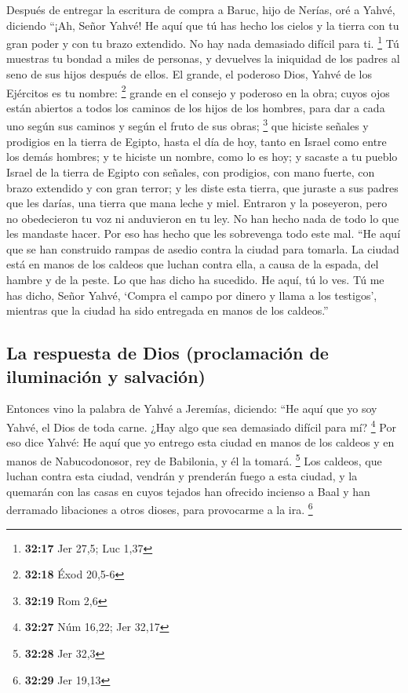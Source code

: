 \begin{paracol}{2}
 Después de entregar la escritura de compra a Baruc, hijo
de Nerías, oré a Yahvé, diciendo  ``¡Ah, Señor Yahvé! He
aquí que tú has hecho los cielos y la tierra con tu gran poder y con tu
brazo extendido. No hay nada demasiado difícil para ti. \footnote{\textbf{32:17}
  Jer 27,5; Luc 1,37}  Tú muestras tu bondad a miles de
personas, y devuelves la iniquidad de los padres al seno de sus hijos
después de ellos. El grande, el poderoso Dios, Yahvé de los Ejércitos es
tu nombre: \footnote{\textbf{32:18} Éxod 20,5-6}  grande
en el consejo y poderoso en la obra; cuyos ojos están abiertos a todos
los caminos de los hijos de los hombres, para dar a cada uno según sus
caminos y según el fruto de sus obras; \footnote{\textbf{32:19} Rom 2,6}
 que hiciste señales y prodigios en la tierra de Egipto,
hasta el día de hoy, tanto en Israel como entre los demás hombres; y te
hiciste un nombre, como lo es hoy;  y sacaste a tu pueblo
Israel de la tierra de Egipto con señales, con prodigios, con mano
fuerte, con brazo extendido y con gran terror;  y les
diste esta tierra, que juraste a sus padres que les darías, una tierra
que mana leche y miel.  Entraron y la poseyeron, pero no
obedecieron tu voz ni anduvieron en tu ley. No han hecho nada de todo lo
que les mandaste hacer. Por eso has hecho que les sobrevenga todo este
mal.  ``He aquí que se han construido rampas de asedio
contra la ciudad para tomarla. La ciudad está en manos de los caldeos
que luchan contra ella, a causa de la espada, del hambre y de la peste.
Lo que has dicho ha sucedido. He aquí, tú lo ves.  Tú me
has dicho, Señor Yahvé, `Compra el campo por dinero y llama a los
testigos', mientras que la ciudad ha sido entregada en manos de los
caldeos.''

\hypertarget{la-respuesta-de-dios-proclamaciuxf3n-de-iluminaciuxf3n-y-salvaciuxf3n}{%
\subsection{La respuesta de Dios (proclamación de iluminación y
salvación)}\label{la-respuesta-de-dios-proclamaciuxf3n-de-iluminaciuxf3n-y-salvaciuxf3n}}

 Entonces vino la palabra de Yahvé a Jeremías, diciendo:
 ``He aquí que yo soy Yahvé, el Dios de toda carne. ¿Hay
algo que sea demasiado difícil para mí? \footnote{\textbf{32:27} Núm
  16,22; Jer 32,17}  Por eso dice Yahvé: He aquí que yo
entrego esta ciudad en manos de los caldeos y en manos de Nabucodonosor,
rey de Babilonia, y él la tomará. \footnote{\textbf{32:28} Jer 32,3}
 Los caldeos, que luchan contra esta ciudad, vendrán y
prenderán fuego a esta ciudad, y la quemarán con las casas en cuyos
tejados han ofrecido incienso a Baal y han derramado libaciones a otros
dioses, para provocarme a la ira. \footnote{\textbf{32:29} Jer 19,13}


\end{paracol}
